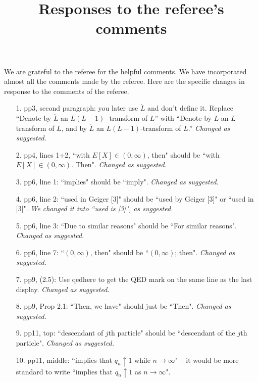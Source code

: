 \documentclass[12pt,a4paper]{amsart}
\title[Responses]{\large Responses to the referee's comments}
\numberwithin{equation}{section}
\begin{document}
\maketitle	
	We are grateful to the referee for the helpful comments.
	We have incorporated almost all the comments made by the referee.
	Here are the specific changes in response to the comments of the referee.
\\
\begin{itemize}
\item[1.]
	pp3, second paragraph: you later use $\dot L$  and don’t define it. 
	Replace ``Denote by $\ddot L$ an $L(L − 1)$- transform of $L$” with ``Denote by $\dot L$ an $L$-transform of $L$, and by $\ddot L$ an $L(L − 1)$-transform of $L$.”
	{\it Changed as suggested.}
\\
\item [2.]
	pp4, lines 1+2, ``with $E[X] \in (0, \infty)$, then" should be ``with $E[X] \in (0, ∞)$. Then".
	{\it Changed as suggested.}
\\
\item [3.]
	pp6, line 1: ``implies" should be ``imply".
	{\it Changed as suggested.}
\\
\item[4.]
	pp6, line 2: ``used in Geiger [3]" should be ``used by Geiger [3]" or ``used in [3]".
	{\it We changed it into ``used is [3]", as suggested.}
\\
\item[5.]
	pp6, line 3: ``Due to similar reasons" should be ``For similar reasons".
	{\it Changed as suggested.}
\\
\item[6.]
	pp6, line 7: ``$(0, \infty)$, then" should be ``$(0, \infty)$; then".
	{\it Changed as suggested.}
\\
\item[7.]
	pp9, (2.5): Use qedhere to get the QED mark on the same line as the last display.
	{\it Changed as suggested.}
\\
\item[8.]
	pp9, Prop 2.1: ``Then, we have" should just be ``Then".
	{\it Changed as suggested.}
\\
\item[9.]
	pp11, top: ``descendant of $j$th particle" should be ``descendant of the $j$th particle".
	{\it Changed as suggested.}
\\
\item[10.]
	pp11, middle: ``implies that $q_n \uparrow 1$ while $n \to \infty$" -- it would be more standard to write ``implies that $q_n \uparrow 1$ as $n \to \infty$".

\end{itemize}
\end{document}
